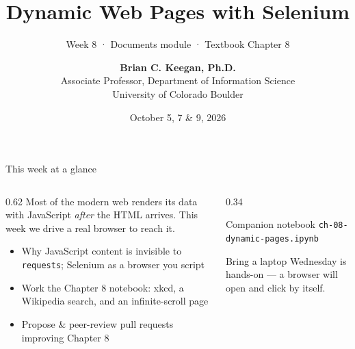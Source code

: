 \documentclass[9pt,aspectratio=169]{beamer}
\title[Week 8 · Dynamic Pages]{{\Huge Dynamic Web Pages with Selenium}}
\subtitle{Week 8 · Documents module · Textbook Chapter 8}
\author[Keegan]{\textbf{Brian C. Keegan, Ph.D.} \\ Associate Professor, Department of Information Science \\ University of Colorado Boulder}
\date{October 5, 7 \& 9, 2026}
\begin{document}
\maketitle

\begin{frame}{This week at a glance}
    \begin{columns}[T]
        \begin{column}{0.62\textwidth}
            Most of the modern web renders its data with JavaScript \textit{after} the HTML arrives. This week we drive a real browser to reach it.

            \vspace{1em}

            \begin{itemize}\small
                \item Why JavaScript content is invisible to \texttt{requests}; Selenium as a browser you script
            \end{itemize}

            \vspace{0.5em}

            \begin{itemize}\small
                \item Work the Chapter 8 notebook: xkcd, a Wikipedia search, and an infinite-scroll page
            \end{itemize}

            \vspace{0.5em}

            \begin{itemize}\small
                \item Propose \& peer-review pull requests improving Chapter 8
            \end{itemize}
        \end{column}
        \begin{column}{0.34\textwidth}
            \begin{block}{Companion notebook}
                \footnotesize \texttt{ch-08-dynamic-pages.ipynb}
            \end{block}
            \begin{alertblock}{Bring a laptop}
                \footnotesize Wednesday is hands-on --- a browser will open and click by itself.
            \end{alertblock}
        \end{column}
    \end{columns}
\end{frame}
\end{document}
